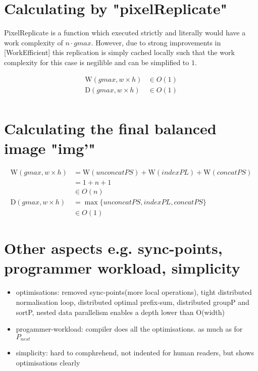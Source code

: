 \documentclass{article}
\newcommand{\ndpn}[0]{$P_{nest}$}
\newcommand{\W}[0]{\textrm{W}}
\newcommand{\D}[0]{\textrm{D}}
\begin{document}
    \section{Calculating by "pixelReplicate"}
      PixelReplicate is a function which executed strictly
      and literally would have a work complexity of $n \cdot gmax$.
      However, due to strong improvements in [WorkEfficient]
      this replication is simply cached locally such that
      the work complexity for this case is negilible and
      can be simplified to $1$.
      
      \begin{equation}
      \begin{split}
      \W(gmax,w \times h)
            & \in O(1) \\
      \D(gmax, w \times h)
            & \in O(1) \\
      \end{split}
      \end{equation}
      
    \section{Calculating the final balanced image "img'"}
      \begin{equation}
      \begin{split}
      \W(gmax, w \times h)
            & = \W(unconcatPS) + \W(indexPL) + \W(concatPS) \\
            & = 1 + n + 1 \\
            & \in O(n) \\
      \D(gmax, w \times h)
          & = \max \{ unconcatPS, indexPL, concatPS \} \\
          & \in O(1)
      \end{split}
      \end{equation}
      
    \section{Other aspects \small{e.g. sync-points, programmer workload, simplicity}}
      \begin{itemize}
        \item optimisations:
          removed sync-points(more local operations),
          tight distributed normalisation loop,
          distributed optimal prefix-sum,
          distributed groupP and sortP,
          nested data parallelism enables a depth lower than O(width)
        \item progammer-workload: compiler does all the optimisations. as much as for \ndpn
        \item simplicity: hard to comphrehend, not indented for human readers, but shows optimisations clearly
      \end{itemize}
      
\end{document}
